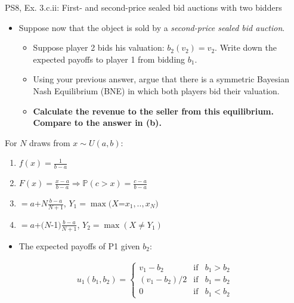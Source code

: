 \begin{frame}{PS8, Ex. 3.c.ii: First- and second-price sealed bid auctions with two bidders}
    \begin{multicols}{2}
      \begin{itemize}
        \item[(c)] Suppose now that the object is sold by a \textit{second-price sealed bid auction}.
        \begin{itemize}\normalsize
          \item[i.]   Suppose player 2 bids his valuation: $b_2(v_2) = v_2$. Write down the expected payoffs to player 1 from bidding $b_1$.
          \item[ii.]  Using your previous answer, argue that there is a symmetric Bayesian Nash Equilibrium (BNE) in which both players bid their valuation.
          \item[iii.] \textbf{Calculate the revenue to the seller from this equilibrium. Compare to the answer in (b).}
        \end{itemize}
      \end{itemize}
      For $N$ draws from $x\sim U(a, b):$
      \vspace{-6pt}
      \begin{enumerate}
        \item[PDF:] $f(x)=\frac{1}{b-a}$
        \item[CDF:] $F(x)=\frac{x-a}{b-a}\Rightarrow\mathbb{P}(c>x)=\frac{c-a}{b-a}$
        \item[$\mathbb{E}(Y_1)$] $=a$+$N\frac{b-a}{N+1}$, $Y_1=\max(X$=$x_1,..,x_N)$
        \item[$\mathbb{E}(Y_2)$] $=a$+$(N$-1$)\frac{b-a}{N+1}$, $Y_2=\max(X\neq Y_1)$
      \end{enumerate}
      \vfill\null\columnbreak
      \begin{itemize}
        \item[(i)] The expected payoffs of P1 given $b_2$:
      \end{itemize}
      \vspace{-12pt}
      \begin{align*}
        u_1(b_1,b_2)=\left\{\begin{array}{lcl}
          v_1-b_2     & \text{if} & b_1>b_2 \\
          (v_1-b_2)/2 & \text{if} & b_1=b_2 \\
          0           & \text{if} & b_1<b_2
        \end{array}\right.
      \end{align*}

\end{multicols}
\end{frame}
